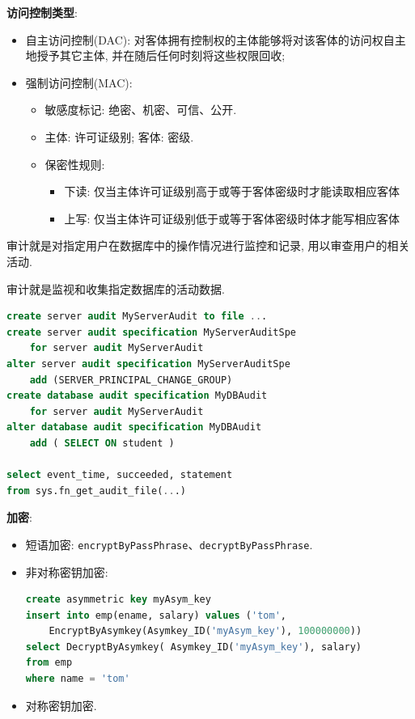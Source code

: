 \textbf{访问控制类型}:
\begin{itemize}
    \item 自主访问控制(DAC): 对客体拥有控制权的主体能够将对该客体的访问权自主地授予其它主体, 并在随后任何时刻将这些权限回收;
    \item 强制访问控制(MAC):
    \begin{itemize}
        \item 敏感度标记: 绝密、机密、可信、公开.
        \item 主体: 许可证级别; 客体: 密级.
        \item 保密性规则: 
        \begin{itemize}
            \item 下读: 仅当主体许可证级别高于或等于客体密级时才能读取相应客体
            \item 上写: 仅当主体许可证级别低于或等于客体密级时体才能写相应客体
        \end{itemize}
    \end{itemize}
\end{itemize}

\begin{definition}[审计]
审计就是对指定用户在数据库中的操作情况进行监控和记录, 用以审查用户的相关活动.

审计就是监视和收集指定数据库的活动数据.
\end{definition}

\begin{lstlisting}[language=SQL]
create server audit MyServerAudit to file ...
create server audit specification MyServerAuditSpe
    for server audit MyServerAudit
alter server audit specification MyServerAuditSpe
    add (SERVER_PRINCIPAL_CHANGE_GROUP)
create database audit specification MyDBAudit
    for server audit MyServerAudit
alter database audit specification MyDBAudit
    add ( SELECT ON student )

select event_time, succeeded, statement
from sys.fn_get_audit_file(...)
\end{lstlisting}

\textbf{加密}:
\begin{itemize}
    \item 短语加密: \verb|encryptByPassPhrase|、\verb|decryptByPassPhrase|.
    \item 非对称密钥加密:
\begin{lstlisting}[language=SQL]
create asymmetric key myAsym_key
insert into emp(ename, salary) values ('tom',
    EncryptByAsymkey(Asymkey_ID('myAsym_key'), 100000000))
select DecryptByAsymkey( Asymkey_ID('myAsym_key'), salary)
from emp
where name = 'tom'
\end{lstlisting}
    \item 对称密钥加密.
\end{itemize}

